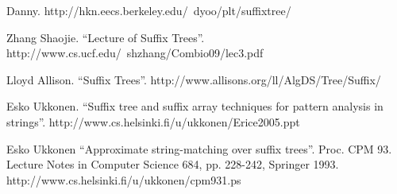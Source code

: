 \documentclass{article}
\begin{document}
\begin{thebibliography}{99}
Danny. http://hkn.eecs.berkeley.edu/~dyoo/plt/suffixtree/

Zhang Shaojie. ``Lecture of Suffix Trees''. http://www.cs.ucf.edu/~shzhang/Combio09/lec3.pdf

Lloyd Allison. ``Suffix Trees''. http://www.allisons.org/ll/AlgDS/Tree/Suffix/

Esko Ukkonen. ``Suffix tree and suffix array techniques for pattern analysis in strings''. http://www.cs.helsinki.fi/u/ukkonen/Erice2005.ppt

Esko Ukkonen ``Approximate string-matching over suffix trees''. Proc. CPM 93. Lecture Notes in Computer Science 684, pp. 228-242, Springer 1993. http://www.cs.helsinki.fi/u/ukkonen/cpm931.ps

\end{thebibliography}

\ifx\wholebook\relax \else
\end{document}

